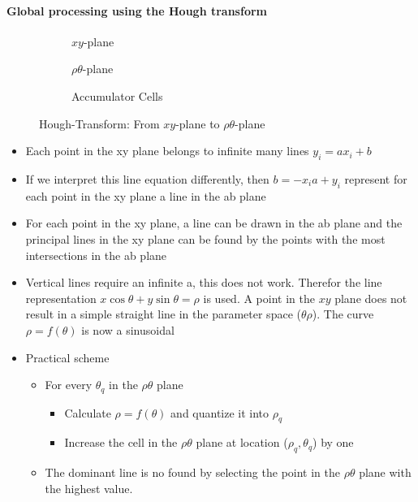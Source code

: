 \paragraph{Global processing using the Hough transform}
\begin{figure}[h]
	\centering
	\begin{subfigure}{0.3\textwidth}
		
		\caption{$xy$-plane}
	\end{subfigure}
	\begin{subfigure}{0.3\textwidth}
		
		\caption{$\rho\theta$-plane}
	\end{subfigure}
	\begin{subfigure}{0.3\textwidth}
		
		\caption{Accumulator Cells}
	\end{subfigure}
	\caption{Hough-Transform: From $xy$-plane to $\rho\theta$-plane}
\end{figure}
\begin{itemize}
\item Each point in the xy plane belongs to infinite many lines $y_i=ax_i+b$
\item If we interpret this line equation differently, then $b=-x_ia+y_i$ represent for each point in the xy plane a line in the ab plane
\item For each point in the xy plane, a line can be drawn in the ab plane and the principal lines in the xy plane can be found by the points with the most intersections in the ab plane
\item Vertical lines require an infinite a, this does not work. Therefor the line representation $x \cos \theta + y \sin \theta = \rho$ is used. A point in the $xy$ plane does not result in a simple straight line in the parameter space ($\theta\rho$). The curve $\rho = f(\theta)$ is now a sinusoidal
\item Practical scheme
\begin{itemize}
\item For every $\theta_q$ in the $\rho\theta$ plane
	\begin{itemize}
		\item Calculate $\rho = f(\theta)$ and quantize it into $\rho_q$
		\item Increase the cell in the $\rho\theta$ plane at location ($\rho_q, \theta_q$) by one
	\end{itemize}
\item The dominant line is no found by selecting the point in the $\rho\theta$ plane with the highest value.
\end{itemize}
\end{itemize}

